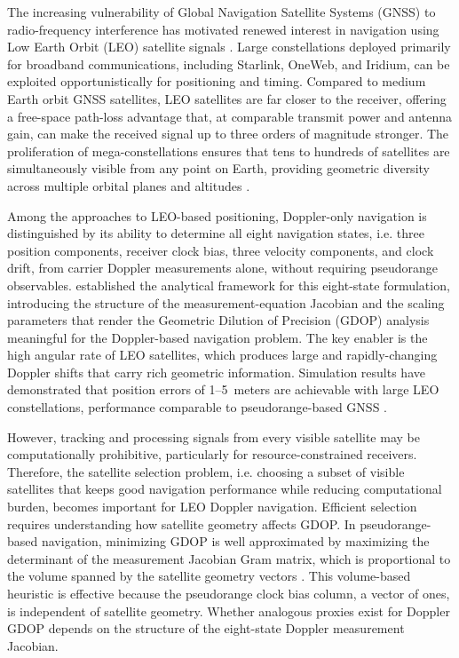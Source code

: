 \documentclass[letterpaper,times]{IONconf-v2}
\theoremstyle{plain}
\theoremstyle{remark}
\begin{document}
The increasing vulnerability of Global Navigation Satellite Systems (GNSS) to radio-frequency interference \parencite{EASA2023} has motivated renewed interest in navigation using Low Earth Orbit (LEO) satellite signals \parencite{Iannucci2020, Reid2018}. Large constellations deployed primarily for broadband communications, including Starlink, OneWeb, and Iridium, can be exploited opportunistically for positioning and timing. Compared to medium Earth orbit GNSS satellites, LEO satellites are far closer to the receiver, offering a free-space path-loss advantage that, at comparable transmit power and antenna gain, can make the received signal up to three orders of magnitude stronger. The proliferation of mega-constellations ensures that tens to hundreds of satellites are simultaneously visible from any point on Earth, providing geometric diversity across multiple orbital planes and altitudes \parencite{Iannucci2020, Reid2018}.

Among the approaches to LEO-based positioning, Doppler-only navigation is distinguished by its ability to determine all eight navigation states, i.e. three position components, receiver clock bias, three velocity components, and clock drift, from carrier Doppler measurements alone, without requiring pseudorange observables. \textcite{Psiaki2021} established the analytical framework for this eight-state formulation, introducing the structure of the measurement-equation Jacobian and the scaling parameters that render the Geometric Dilution of Precision (GDOP) analysis meaningful for the Doppler-based navigation problem. The key enabler is the high angular rate of LEO satellites, which produces large and rapidly-changing Doppler shifts that carry rich geometric information. Simulation results have demonstrated that position errors of 1--5~meters are achievable with large LEO constellations, performance comparable to pseudorange-based GNSS \parencite{Psiaki2021}.

However, tracking and processing signals from every visible satellite may be computationally prohibitive, particularly for resource-constrained receivers. Therefore, the satellite selection problem, i.e. choosing a subset of visible satellites that keeps good navigation performance while reducing computational burden, becomes important for LEO Doppler navigation. Efficient selection requires understanding how satellite geometry affects GDOP. In pseudorange-based navigation, minimizing GDOP is well approximated by maximizing the determinant of the measurement Jacobian Gram matrix, which is proportional to the volume spanned by the satellite geometry vectors \parencite{BlancoDelgado2017}. This volume-based heuristic is effective because the pseudorange clock bias column, a vector of ones, is independent of satellite geometry. Whether analogous proxies exist for Doppler GDOP depends on the structure of the eight-state Doppler measurement Jacobian.
\end{document}
